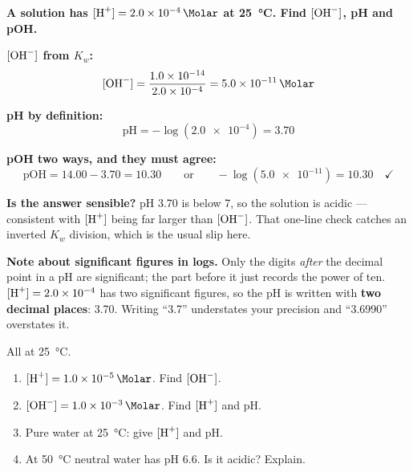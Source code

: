 \documentclass{apchem-worksheet}
\begin{document}
\begin{workedexample}
\textbf{A solution has $[\ce{H+}] = \SI{2.0e-4}{\Molar}$ at
\SI{25}{\celsius}. Find $[\ce{OH-}]$, pH and pOH.}

\textbf{$[\ce{OH-}]$ from $K_{w}$:}
\[ [\ce{OH-}] = \frac{\num{1.0e-14}}{\num{2.0e-4}}
   = \SI{5.0e-11}{\Molar} \]

\textbf{pH by definition:}
\[ \text{pH} = -\log(\num{2.0e-4}) = \mathbf{3.70} \]

\textbf{pOH two ways, and they must agree:}
\[ \text{pOH} = 14.00 - 3.70 = \mathbf{10.30}
   \qquad\text{or}\qquad
   -\log(\num{5.0e-11}) = 10.30 \quad\checkmark \]

\textbf{Is the answer sensible?} pH 3.70 is below 7, so the solution is
acidic --- consistent with $[\ce{H+}]$ being far larger than
$[\ce{OH-}]$. That one-line check catches an inverted $K_{w}$ division,
which is the usual slip here.

\textbf{Note about significant figures in logs.} Only the digits
\emph{after} the decimal point in a pH are significant; the part before
it just records the power of ten. $[\ce{H+}] = \num{2.0e-4}$ has two
significant figures, so the pH is written with \textbf{two decimal
places}: 3.70. Writing ``3.7'' understates your precision and ``3.6990''
overstates it.
\end{workedexample}

\begin{yourturn}
All at \SI{25}{\celsius}.
\begin{enumerate}[leftmargin=*,itemsep=0.5em]
  \item $[\ce{H+}] = \SI{1.0e-5}{\Molar}$. Find $[\ce{OH-}]$.
        \workspace[1.6cm]
  \item $[\ce{OH-}] = \SI{1.0e-3}{\Molar}$. Find $[\ce{H+}]$ and pH.
        \workspace[1.8cm]
  \item Pure water at \SI{25}{\celsius}: give $[\ce{H+}]$ and pH.
        \workspace[1.6cm]
  \item At \SI{50}{\celsius} neutral water has pH 6.6. Is it acidic?
        Explain. \workspace[1.8cm]
\end{enumerate}
\end{yourturn}
\end{document}
